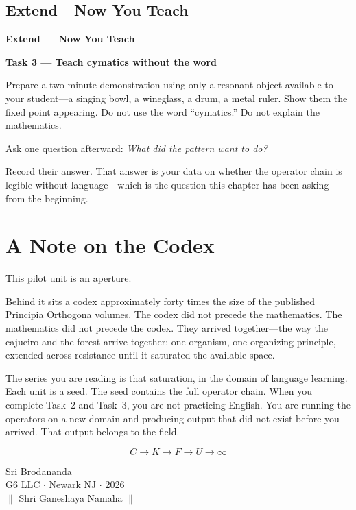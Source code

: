 \documentclass[11pt, twoside, openright]{book}
\theoremstyle{plain}
\theoremstyle{definition}
\newenvironment{extendbox}{%
  \begin{mdframed}[backgroundcolor=ExtendBox,linecolor=violet!70,linewidth=0.5pt,innertopmargin=6pt,innerbottommargin=6pt]
  \noindent\textbf{Extend --- Now You Teach}\par\medskip}{\end{mdframed}}
\begin{document}
\section{Extend---Now You Teach}

\begin{extendbox}
\textbf{Task 3 --- Teach cymatics without the word}

Prepare a two-minute demonstration using only a resonant object
available to your student---a singing bowl, a wineglass, a drum, a
metal ruler. Show them the fixed point appearing. Do not use the word
``cymatics.'' Do not explain the mathematics.

Ask one question afterward: \textit{What did the pattern want to do?}

Record their answer. That answer is your data on whether the operator
chain is legible without language---which is the question this chapter
has been asking from the beginning.
\end{extendbox}

\chapter*{A Note on the Codex}

This pilot unit is an aperture.

Behind it sits a codex approximately forty times the size of the
published Principia Orthogona volumes. The codex did not precede the
mathematics. The mathematics did not precede the codex. They arrived
together---the way the cajueiro and the forest arrive together: one
organism, one organizing principle, extended across resistance until it
saturated the available space.

The series you are reading is that saturation, in the domain of language
learning. Each unit is a seed. The seed contains the full operator
chain. When you complete Task~2 and Task~3, you are not practicing
English. You are running the operators on a new domain and producing
output that did not exist before you arrived. That output belongs to
the field.

\[
C \longrightarrow K \longrightarrow F \longrightarrow U \longrightarrow \infty
\]

\begin{flushright}
Sri Brodananda\\
G6 LLC $\cdot$ Newark NJ $\cdot$ 2026\\[6pt]
$\parallel$ Shri Ganeshaya Namaha $\parallel$
\end{flushright}
\end{document}

